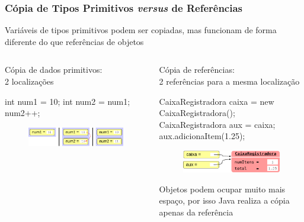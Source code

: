 \documentclass[xcolor={dvipsnames,table},aspectratio=169]{beamer}
\begin{document}
\begin{frame}[fragile]\frametitle{Cópia de Tipos Primitivos \emph{versus} de Referências}
\begin{itemize}
{\small
	\item Variáveis de tipos primitivos podem ser copiadas, mas funcionam de forma diferente do que referências de objetos
}
\end{itemize}
\begin{columns}[T]
	\begin{column}{0.35\linewidth}
\begin{itemize}
{\scriptsize
	\item Cópia de dados primitivos:\\2 localizações
{\scriptsize
\begin{javacode}
int num1 = 10;
int num2 = num1;
num2++;
\end{javacode}
}
\begin{figure}[h]
	\includegraphics[height=0.11\paperheight,center]{pucrs-ep-fprog-unidade_07-objetos_e_classes-laminas-copia_de_primitivos.png}
\end{figure}
}
\end{itemize}
	\end{column}
	\begin{column}{0.65	\linewidth}
\begin{itemize}
{\scriptsize
	\item Cópia de referências:\\2 referências para a mesma localização
{\scriptsize
\begin{javacode}
CaixaRegistradora caixa = new CaixaRegistradora();
CaixaRegistradora aux = caixa;
aux.adicionaItem(1.25);
\end{javacode}
}
\begin{figure}[h]
	\includegraphics[height=0.14\paperheight,center]{pucrs-ep-fprog-unidade_07-objetos_e_classes-laminas-copia_de_referencias.png}
\end{figure}
	\item Objetos podem ocupar muito mais espaço, por isso Java realiza a cópia apenas da referência
}
\end{itemize}	
	\end{column}
\end{columns}
\end{frame}
\end{document}
